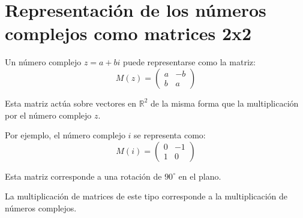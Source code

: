\section{Representación de los números complejos como matrices 2x2}\label{sec:complejos}
Un número complejo $z = a + bi$ puede representarse como la matriz:
\begin{equation*}
M(z) = \begin{pmatrix}
a & -b \\
b & a
\end{pmatrix}
\end{equation*}

Esta matriz actúa sobre vectores en $\mathbb{R}^2$ de la misma forma que la multiplicación por el número complejo $z$.

Por ejemplo, el número complejo $i$ se representa como:
\begin{equation*}
M(i) = \begin{pmatrix}
0 & -1 \\
1 & 0
\end{pmatrix}
\end{equation*}

Esta matriz corresponde a una rotación de $90^\circ$ en el plano.

La multiplicación de matrices de este tipo corresponde a la multiplicación de números complejos.
